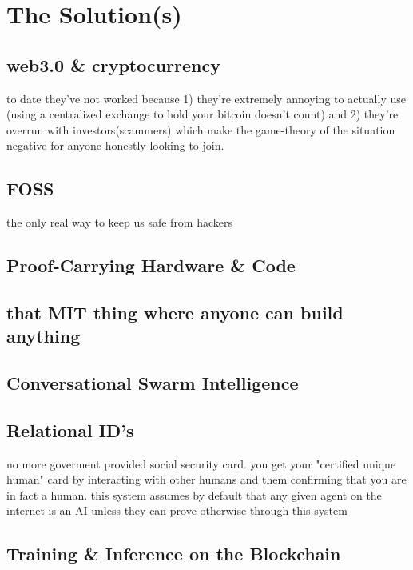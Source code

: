 \documentclass{article}
\begin{document}
\section{The Solution(s)}

\subsection{web3.0 \& cryptocurrency}
to date they've not worked because 1) they're extremely annoying to actually use (using a centralized exchange to hold your bitcoin doesn't count) and 2) they're overrun with investors(scammers) which make the game-theory of the situation negative for anyone honestly looking to join. 

\subsection{FOSS}
the only real way to keep us safe from hackers

\subsection{Proof-Carrying Hardware \& Code}

\subsection{that MIT thing where anyone can build anything}

\subsection{Conversational Swarm Intelligence}

\subsection{Relational ID's}
no more goverment provided social security card. you get your "certified unique human" card by interacting with other humans and them confirming that you are in fact a human. this system assumes by default that any given agent on the internet is an AI unless they can prove otherwise through this system

\subsection{Training \& Inference on the Blockchain}
\cite{panzade2024can, borzunov2022petals}
\end{document}
